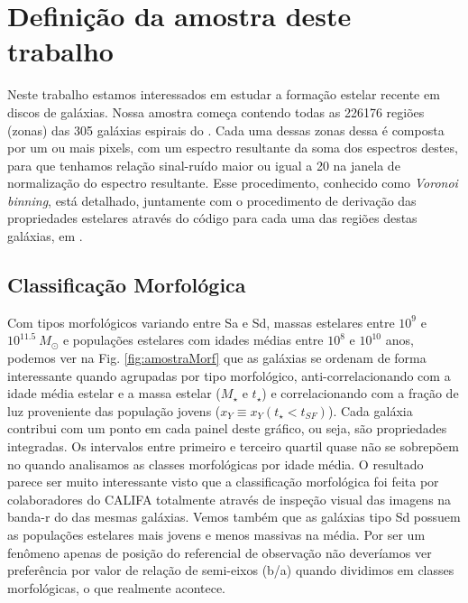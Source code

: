 \section{Definição da amostra deste trabalho}
\label{sec:amostra:definicao}

Neste trabalho estamos interessados em estudar a formação estelar recente em discos de galáxias.
Nossa amostra começa contendo todas as 226176 regiões (zonas) das 305 galáxias espirais do \CAL.
Cada uma dessas zonas dessa é composta por um ou mais pixels, com um espectro resultante da soma dos
espectros destes, para que tenhamos relação sinal-ruído maior ou igual a 20 na janela de
normalização do espectro resultante. Esse procedimento, conhecido como {\em Voronoi binning}, está
detalhado, juntamente com o procedimento de derivação das propriedades estelares através do código
\starlight para cada uma das regiões destas galáxias, em \citet{CidFernandes.etal.2013a}.

\subsection{Classificação Morfológica}
\label{sec:amostra:morf}

Com tipos morfológicos variando entre Sa e Sd, massas estelares entre $10^9$ e $10^{11.5}\ M_\odot$
e populações estelares com idades médias entre $10^8$ e $10^{10}$ anos, podemos ver na Fig.
\ref{fig:amostraMorf} que as galáxias se ordenam de forma interessante quando agrupadas por tipo
morfológico, anti-correlacionando com a idade média estelar e a massa estelar ($M_\star$ e
$t_\star$) e correlacionando com a fração de luz proveniente das população jovens ($x_Y \equiv x_Y(t_\star <
t_{SF})$). Cada galáxia contribui com um ponto em cada painel deste gráfico, ou seja, são
propriedades integradas. Os intervalos entre primeiro e terceiro quartil quase não se sobrepõem no
quando analisamos as classes morfológicas por idade média. O resultado parece ser muito interessante
visto que a classificação morfológica foi feita por colaboradores do CALIFA totalmente através de
inspeção visual das imagens na banda-r do \SDSS das mesmas galáxias. Vemos também que as galáxias
tipo Sd possuem as populações estelares mais jovens e menos massivas na média. Por ser um fenômeno
apenas de posição do referencial de observação não deveríamos ver preferência por valor de relação
de semi-eixos (b/a) quando dividimos em classes morfológicas, o que realmente acontece.

